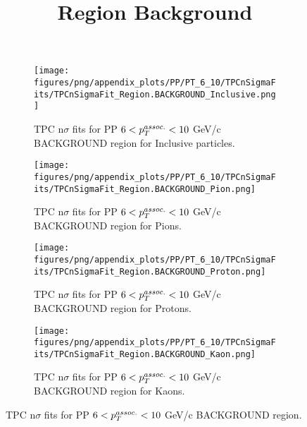             \begin{figure}[H]
                \title{Region Background}
                \begin{subfigure}[b]{0.5\textwidth}
                    \centering
                    \texttt{[image: figures/png/appendix\_plots/PP/PT\_6\_10/TPCnSigmaFits/TPCnSigmaFit\_Region.BACKGROUND\_Inclusive.png]}
                    \caption{TPC n$\sigma$ fits for PP $6 < \pTassoc < 10$ GeV/c BACKGROUND region for Inclusive particles.}
                    \label{fig:appendix_PP_$6 < \pTassoc < 10$ GeV/c_BACKGROUND_Inclusive}
                \end{subfigure}
                \begin{subfigure}[b]{0.5\textwidth}
                    \centering
                    \texttt{[image: figures/png/appendix\_plots/PP/PT\_6\_10/TPCnSigmaFits/TPCnSigmaFit\_Region.BACKGROUND\_Pion.png]}
                    \caption{TPC n$\sigma$ fits for PP $6 < \pTassoc < 10$ GeV/c BACKGROUND region for Pions.}
                    \label{fig:appendix_PP_$6 < \pTassoc < 10$ GeV/c_BACKGROUND_Pion}
                \end{subfigure}
                \begin{subfigure}[b]{0.5\textwidth}
                    \centering
                    \texttt{[image: figures/png/appendix\_plots/PP/PT\_6\_10/TPCnSigmaFits/TPCnSigmaFit\_Region.BACKGROUND\_Proton.png]}
                    \caption{TPC n$\sigma$ fits for PP $6 < \pTassoc < 10$ GeV/c BACKGROUND region for Protons.}
                    \label{fig:appendix_PP_$6 < \pTassoc < 10$ GeV/c_BACKGROUND_Proton}
                \end{subfigure}
                \begin{subfigure}[b]{0.5\textwidth}
                    \centering
                    \texttt{[image: figures/png/appendix\_plots/PP/PT\_6\_10/TPCnSigmaFits/TPCnSigmaFit\_Region.BACKGROUND\_Kaon.png]}
                    \caption{TPC n$\sigma$ fits for PP $6 < \pTassoc < 10$ GeV/c BACKGROUND region for Kaons.}
                    \label{fig:appendix_PP_$6 < \pTassoc < 10$ GeV/c_BACKGROUND_Kaon}
                \end{subfigure}
                \caption{TPC n$\sigma$ fits for PP $6 < \pTassoc < 10$ GeV/c BACKGROUND region.}
                \label{fig:appendix_PP_$6 < \pTassoc < 10$ GeV/c_BACKGROUND}
            \end{figure}
            \clearpage
            
